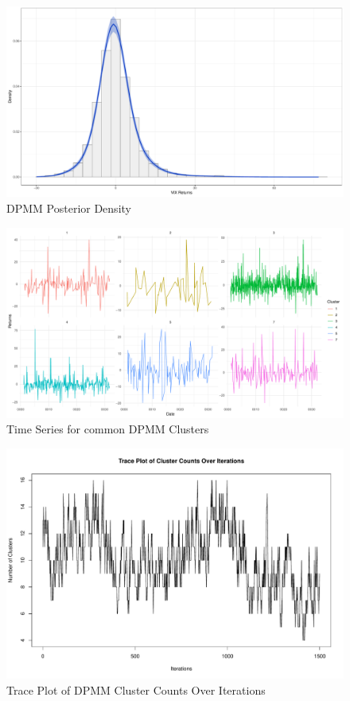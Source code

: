 \documentclass[12pt]{report} %
\begin{document}
\vspace{0.3cm}

\begin{figure}[ht]
    \centering
    \includegraphics[width=\textwidth]{DPMMposteriordensity.pdf}
    \caption{DPMM Posterior Density}
    \label{fig:DPMMposteriordensity}
\end{figure}

\begin{figure}[ht]
    \centering
    \includegraphics[width=\textwidth]{TimeClust.pdf}
    \caption{Time Series for common DPMM Clusters}
    \label{fig:TimeClust}
\end{figure}

\begin{figure}[ht]
    \centering
    \includegraphics[width=\textwidth]{Trace Plot.pdf}
    \caption{Trace Plot of DPMM Cluster Counts Over Iterations}
    \label{fig:TracePlot}
\end{figure}
\end{document}
